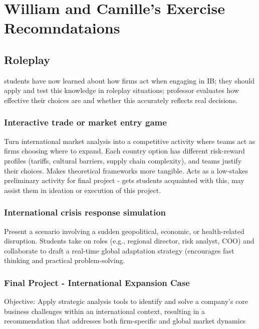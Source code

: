 \documentclass[
  11pt,
]{article}
\begin{document}
\section{William and Camille's Exercise
Recomndataions}\label{william-and-camilles-exercise-recomndataions}

\subsection{Roleplay}\label{roleplay}

students have now learned about how firms act when engaging in IB; they
should apply and test this knowledge in roleplay situations; professor
evaluates how effective their choices are and whether this accurately
reflects real decisions.

\subsubsection{Interactive trade or market entry
game}\label{interactive-trade-or-market-entry-game}

Turn international market analysis into a competitive activity where
teams act as firms choosing where to expand. Each country option has
different risk-reward profiles (tariffs, cultural barriers, supply chain
complexity), and teams justify their choices. Makes theoretical
frameworks more tangible. Acts as a low-stakes preliminary activity for
final project - gets students acquainted with this, may assist them in
ideation or execution of this project.

\subsubsection{International crisis response
simulation}\label{international-crisis-response-simulation}

Present a scenario involving a sudden geopolitical, economic, or
health-related disruption. Students take on roles (e.g., regional
director, risk analyst, COO) and collaborate to draft a real-time global
adaptation strategy (encourages fast thinking and practical
problem-solving.

\subsubsection{Final Project - International Expansion
Case}\label{final-project---international-expansion-case}

Objective: Apply strategic analysis tools to identify and solve a
company's core business challenges within an international context,
resulting in a recommendation that addresses both firm-specific and
global market dynamics
\end{document}
